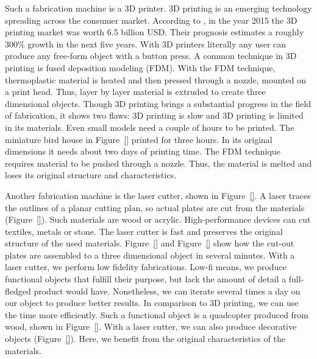 \documentclass[../ClassicThesis.tex]{subfiles}
\begin{document}
Such a fabrication machine is a 3D printer. 3D printing is an emerging
technology spreading across the consumer market. According to
, in the year 2015 the 3D printing market was
worth 6.5 billion USD. Their prognosis estimates a roughly 300\%
growth in the next five years\cite{wohlers-market}. With 3D printers
literally any user can produce any free-form object with a button
press. A common technique in 3D printing is fused deposition modeling
(FDM)\cite{}. With the FDM technique,
thermoplastic material is heated and then pressed through a nozzle,
mounted on a print head. Thus, layer by layer material is extruded to
create three dimensional objects\cite{}. Though 3D printing brings a substantial progress in the
field of fabrication, it shows two flaws: 3D printing is slow and 3D
printing is limited in its materials. Even small models need a couple
of hours to be printed. The miniature bird house in
Figure~\ref{} printed for three hours. In its original
dimensions it needs about two days of printing time. The FDM technique
requires material to be pushed through a nozzle. Thus, the material is
melted and loses its original structure and characteristics.


Another fabrication machine is the laser cutter, shown in
Figure~\ref{}. A laser traces the outlines of a planar
cutting plan, so actual plates are cut from the materials
(Figure~\ref{}). Such materials are wood or acrylic.
High-performance devices can cut textiles, metals or stone. The laser
cutter is fast and preserves the original structure of the used
materials. Figure~\ref{} and Figure~\ref{} show how the cut-out plates
are assembled to a three dimensional object in several minutes. With a
laser cutter, we perform low fidelity fabrications. Low-fi means, we
produce functional objects that fulfill their purpose, but lack the
amount of detail a full-fledged product would have. Nonetheless, we
can iterate several times a day on our object to produce better
results. In comparison to 3D printing, we can use the time more
efficiently. Such a functional object is a quadcopter produced from
wood, shown in Figure~\ref{}. With a laser cutter, we can
also produce decorative objects (Figure~\ref{}). Here, we
benefit from the original characteristics of the materials.
\end{document}
